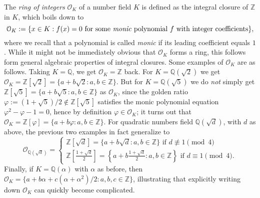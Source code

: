 \documentclass[a4paper,USenglish,cleveref, autoref, thm-restate]{lipics-v2021}
\newcommand{\OK}[1][K]{\mathcal{O}_{#1}}
\newcommand{\Q}{\mathbb{Q}}
\newcommand{\Z}{\mathbb{Z}}
\begin{document}
The \emph{ring of integers} $\OK$ of a number field $K$ is defined as the integral closure of $\Z$ in $K$, which boils down to
\[
  \OK := \{x \in K : f(x)=0 \text{ for some \emph{monic} polynomial } f \text{ with integer coefficients}\},\]
where we recall that a polynomial is called \emph{monic} if its leading coefficient equals $1$.
While it might not be immediately obvious that $\OK$ forms a ring, this follows form general algebraic properties of integral closures.
Some examples of $\OK$ are as follows. Taking $K=\Q$, we get $\OK=\Z$ back. For $K=\Q(\sqrt{2})$ we get $\OK=\Z[\sqrt{2}]=\{a+b\sqrt{2} : a,b \in \Z\}$. But for $K=\Q(\sqrt{5})$ we do \emph{not} simply get $\Z[\sqrt{5}]=\{a+b\sqrt{5} : a,b \in \Z\}$ as $\OK$, since the golden ratio $\varphi:=(1+\sqrt{5})/2\not\in \Z[\sqrt{5}]$ satisfies the monic polynomial equation $\varphi^2-\varphi-1=0$, hence by definition $\varphi \in \OK$; it turns out that $\OK=\Z[\varphi]=\{a+b\varphi : a,b \in \Z\}$. For quadratic numbers field $\Q(\sqrt{d})$, with $d$ as above, the previous two examples in fact generalize to
\begin{equation*}
\OK[\Q(\sqrt{d})]=
\begin{cases}
\Z[\sqrt{d}]=\{a+b\sqrt{d}: a,b \in \Z\} \text { if } d \not\equiv 1 \pmod{4}\\
 \Z\left[\frac{1+\sqrt{d}}{2}\right]=\left\{a+b \frac{1+\sqrt{d}}{2} : a,b \in \Z \right\} \text { if } d \equiv 1 \pmod{4}.
\end{cases}
\end{equation*}%
Finally, if $K=\Q(\alpha)$ with $\alpha$ as before, then $\OK=\{a+b \alpha+c (\alpha+\alpha^2)/2 : a,b,c \in \Z\}$, illustrating that explicitly writing down $\OK$ can quickly become complicated.
\end{document}
